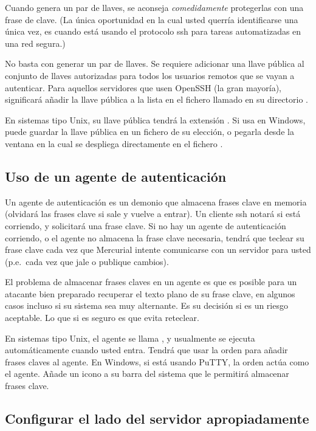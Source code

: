 Cuando genera un par de llaves, se aconseja \emph{comedidamente} 
protegerlas con una frase de clave.  (La única oportunidad en la cual
usted querría identificarse una única vez, es cuando está usando
el protocolo ssh para tareas automatizadas en una red segura.)

No basta con generar un par de llaves.  Se requiere adicionar una llave
pública al conjunto de llaves autorizadas para todos los usuarios
remotos que se vayan a autenticar.  Para aquellos servidores que usen
OpenSSH (la gran mayoría), significará añadir la llave pública a la
lista en el fichero llamado  en su
directorio .

En sistemas tipo Unix, su llave pública tendrá la extensión
.  Si usa  en Windows, puede
guardar la llave pública en un fichero de su elección, o pegarla desde
la ventana en la cual se despliega directamente en el fichero
.

\subsection{Uso de un agente de autenticación}

Un agente de autenticación es un demonio que almacena frases clave en
memoria (olvidará las frases clave si sale y vuelve a entrar).  Un cliente
ssh notará si está corriendo, y solicitará una frase clave.  Si no hay
un agente de autenticación corriendo, o el agente no almacena la frase
clave necesaria, tendrá que teclear su frase clave cada vez que 
Mercurial intente comunicarse con un servidor para usted (p.e.~cada vez
que jale o publique cambios).

El problema de almacenar frases claves en un agente es que es posible
para un atacante bien preparado recuperar el texto plano de su frase
clave, en algunos casos incluso si su sistema sea muy alternante.
Es su decisión si es un riesgo aceptable.  Lo que si es seguro es que
evita reteclear.

En sistemas tipo Unix, el agente se llama , y
usualmente se ejecuta automáticamente cuando usted entra.  Tendrá que
usar la orden  para añadir frases claves al agente.  En
Windows, si está usando PuTTY, la orden  actúa como
el agente.  Añade un icono a su barra del sistema que le permitirá
almacenar frases clave.

\subsection{Configurar el lado del servidor apropiadamente}

